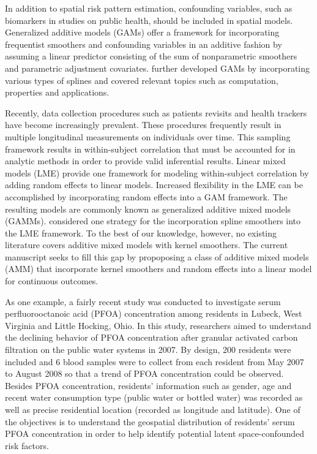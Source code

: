 	In addition to spatial risk pattern estimation, confounding variables, such as biomarkers in studies on public health, should be included in spatial models. Generalized additive models (GAMs) \citep{hastie1990generalized} offer a framework for incorporating frequentist smoothers and confounding variables in an additive fashion by assuming a linear predictor consisting of the sum of nonparametric smoothers and parametric adjustment covariates. \citet{wood2017generalized} further developed GAMs by incorporating various types of splines and covered relevant topics such as computation, properties and applications. 
	
	Recently, data collection procedures such as patients revisits and health trackers have become increasingly prevalent. These procedures frequently result in multiple longitudinal measurements on individuals over time. This sampling framework results in within-subject correlation that must be accounted for in analytic methods in order to provide valid inferential results. Linear mixed models (LME) provide one framework for modeling within-subject correlation by adding random effects to linear models. Increased flexibility in the LME can be accomplished by incorporating random effects into a GAM framework. The resulting models are commonly known as generalized additive mixed models (GAMMs). \citet{lin1999inference} considered one strategy for the incorporation spline smoothers into the LME framework. To the best of our knowledge, however, no existing literature covers additive mixed models with kernel smoothers. The current manuscript seeks to fill this gap by propoposing a class of additive mixed models (AMM) that incorporate kernel smoothers and random effects into a linear model for continuous outcomes. 
	
	As one example, a fairly recent study was conducted to investigate serum perfluorooctanoic acid (PFOA) concentration among residents in Lubeck, West Virginia and Little Hocking, Ohio. \citep{bartell2010rate} In this study, researchers aimed to understand the declining behavior of PFOA concentration after granular activated carbon filtration on the public water systems in 2007. By design, 200 residents were included and 6 blood samples were to collect from each resident from May 2007 to August 2008 so that a trend of PFOA concentration could be observed. Besides PFOA concentration, residents' information such as gender, age and recent water consumption type (public water or bottled water) was recorded as well as precise residential location (recorded as longitude and latitude). One of the objectives is to understand the geospatial distribution of residents' serum PFOA concentration in order to help identify potential latent space-confounded risk factors. 
	
